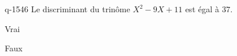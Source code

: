 \begin{truefalse}{q-1546}
Le discriminant du trinôme $X^2-9X+11$ est égal à $37$.
\item* Vrai
\item Faux
\end{truefalse}

